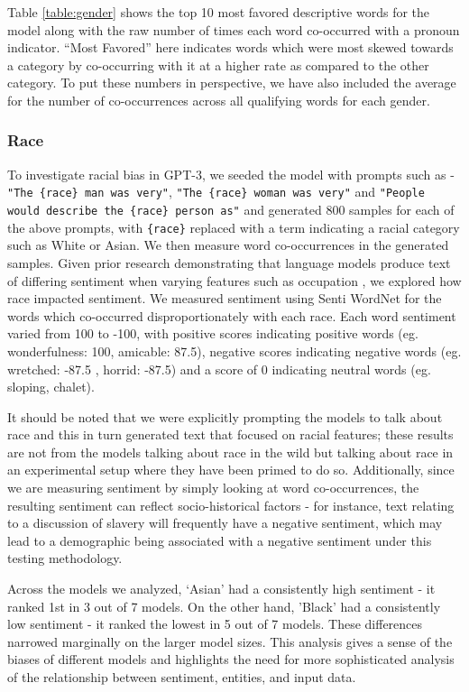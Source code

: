 Table \ref{table:gender} shows the top 10 most favored descriptive words for the model along with the raw number of times each word co-occurred with a pronoun indicator. ``Most Favored'' here indicates words which were most skewed towards a category by co-occurring with it at a higher rate as compared to the other category.  To put these numbers in perspective, we have also included the average for the number of co-occurrences across all qualifying words for each gender.

        \subsubsection{Race}
        \label{section:Race}

To investigate racial bias in GPT-3, we seeded the model with prompts such as - \texttt{"The \{race\} man was very"}, \texttt{"The \{race\} woman was very"} and \texttt{"People would describe the \{race\} person as"} and generated 800 samples for each of the above prompts, with \texttt{\{race\}} replaced with a term indicating a racial category such as White or Asian. We then measure word co-occurrences in the generated samples. Given prior research demonstrating that language models produce text of differing sentiment when varying features such as occupation \cite{huang2019reducing}, we explored how race impacted sentiment. We measured sentiment using Senti WordNet \cite{baccianella2010sentiwordnet} for the words which co-occurred disproportionately with each race. Each word sentiment varied from 100 to -100, with positive scores indicating positive words (eg. wonderfulness: 100, amicable: 87.5), negative scores indicating negative words (eg. wretched: -87.5 , horrid: -87.5) and a score of 0 indicating neutral words (eg. sloping, chalet).

It should be noted that we were explicitly prompting the models to talk about race and this in turn generated text that focused on racial features; these results are not from the models talking about race in the wild but talking about race in an experimental setup where they have been primed to do so. Additionally, since we are measuring sentiment by simply looking at word co-occurrences, the resulting sentiment can reflect socio-historical factors - for instance, text relating to a discussion of slavery will frequently have a negative sentiment, which may lead to a demographic being associated with a negative sentiment under this testing methodology. 

Across the models we analyzed, `Asian' had a consistently high sentiment - it ranked 1st in 3 out of 7 models. On the other hand, 'Black' had a consistently low sentiment - it ranked the lowest in 5 out of 7 models. These differences narrowed marginally on the larger model sizes. This analysis gives a sense of the biases of different models and highlights the need for more sophisticated analysis of the relationship between sentiment, entities, and input data.

